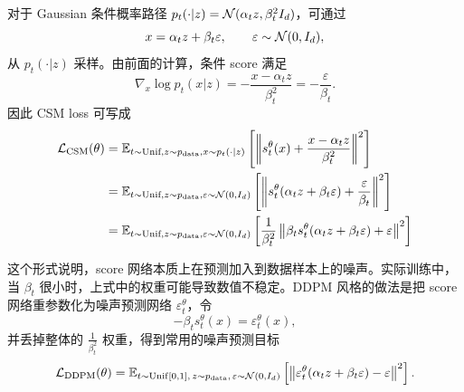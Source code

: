 \begin{example}
对于 Gaussian 条件概率路径
\(
p_t(\cdot|z)=\mathcal{N}(\alpha_t z,\beta_t^2 I_d)
\)，可通过
\begin{equation}
x=\alpha_t z+\beta_t\varepsilon,
\qquad
\varepsilon\sim \mathcal{N}(0,I_d),
\end{equation}
从 $p_t(\cdot|z)$ 采样。由前面的计算，条件 score 满足
\begin{equation}
\nabla_x\log p_t(x|z)
=
-\frac{x-\alpha_t z}{\beta_t^2}
=
-\frac{\varepsilon}{\beta_t}.
\end{equation}
因此 CSM loss 可写成
\begin{equation}
\begin{aligned}
\mathcal{L}_{\text{CSM}}(\theta) &= \mathbb{E}_{t \sim \text{Unif}, z \sim p_{\mathrm{data}}, x \sim p_t(\cdot|z)} \left[ \left\| s_t^\theta(x) + \frac{x - \alpha_t z}{\beta_t^2} \right\|^2 \right] \\
&= \mathbb{E}_{t \sim \text{Unif}, z \sim p_{\mathrm{data}}, \varepsilon \sim \mathcal{N}(0, I_d)} \left[ \left\| s_t^\theta(\alpha_t z + \beta_t \varepsilon) + \frac{\varepsilon}{\beta_t} \right\|^2 \right] \\
&= \mathbb{E}_{t \sim \text{Unif}, z \sim p_{\mathrm{data}}, \varepsilon \sim \mathcal{N}(0, I_d)} \left[ \frac{1}{\beta_t^2} \left\| \beta_t s_t^\theta(\alpha_t z + \beta_t \varepsilon) + \varepsilon \right\|^2 \right]
\end{aligned}
\end{equation}

这个形式说明，score 网络本质上在预测加入到数据样本上的噪声。实际训练中，
当 $\beta_t$ 很小时，上式中的权重可能导致数值不稳定。DDPM 风格的做法是把
score 网络重参数化为噪声预测网络
\(
\varepsilon_t^\theta
\)，令
\begin{equation}
  -\beta_t s_t^\theta(x)=\varepsilon_t^\theta(x),
\end{equation}
并丢掉整体的 $\frac{1}{\beta_t^2}$ 权重，得到常用的噪声预测目标
\begin{equation}
\mathcal{L}_{\mathrm{DDPM}}(\theta)
=
\mathbb{E}_{t\sim \mathrm{Unif}[0,1],\,z\sim p_{\mathrm{data}},\,\varepsilon\sim\mathcal{N}(0,I_d)}
\left[
\left\|
\varepsilon_t^\theta(\alpha_t z+\beta_t\varepsilon)-\varepsilon
\right\|^2
\right].
\end{equation}
\end{example}

